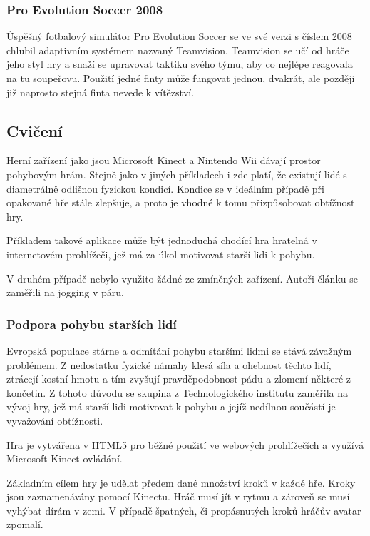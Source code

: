 \subsubsection{Pro Evolution Soccer 2008}

Úspěšný fotbalový simulátor Pro Evolution Soccer se ve své verzi s číslem 2008 chlubil adaptivním systémem nazvaný Teamvision. Teamvision se učí od hráče jeho styl hry a snaží se upravovat taktiku svého týmu, aby co nejlépe reagovala na tu soupeřovu. Použití jedné finty může fungovat jednou, dvakrát, ale později již naprosto stejná finta nevede k vítězství. \cite{6}

\subsection{Cvičení}

Herní zařízení jako jsou Microsoft Kinect a Nintendo Wii dávají prostor pohybovým hrám. Stejně jako v jiných příkladech i zde platí, že existují lidé s diametrálně odlišnou fyzickou kondicí. Kondice se v ideálním případě při opakované hře stále zlepšuje, a proto je vhodné k tomu přizpůsobovat obtížnost hry.

Příkladem takové aplikace může být jednoduchá chodící hra hratelná v internetovém prohlížeči, jež má za úkol motivovat starší lidi k pohybu.

V druhém případě nebylo využito žádné ze zmíněných zařízení. Autoři článku \cite{7} se zaměřili na jogging v páru. 

\subsubsection{Podpora pohybu starších lidí}

Evropská populace stárne a odmítání pohybu staršími lidmi se stává závažným problémem. Z nedostatku fyzické námahy klesá síla a ohebnost těchto lidí, ztrácejí kostní hmotu a tím zvyšují pravděpodobnost pádu a zlomení některé z končetin. Z tohoto důvodu se skupina z Technologického institutu zaměřila na vývoj hry, jež má starší lidi motivovat k pohybu a jejíž nedílnou součástí je vyvažování obtížnosti. \cite{8}

Hra je vytvářena v HTML5 pro běžné použití ve webových prohlížečích a využívá Microsoft Kinect ovládání.

Základním cílem hry je udělat předem dané množství kroků v každé hře. Kroky jsou zaznamenávány pomocí Kinectu. Hráč musí jít v rytmu a zároveň se musí vyhýbat dírám v zemi. V případě špatných, či propásnutých kroků hráčův avatar zpomalí.

